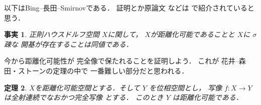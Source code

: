 \documentclass[leqno, a4paper, 12pt]{jsarticle}
\newtheorem{thm}{定理}
\newtheorem{fact}[thm]{事実}
\begin{document}
以下はBing--長田--Smirnovである．
証明とか原論文
などは
\cite{Den3}
で紹介されていると思う．
\begin{fact}\label{fact:bns}
正則ハウスドルフ空間
$X$に関して，
$X$が距離化可能であることと
$X$に
$\sigma$疎な
開基が存在することは同値である．
\end{fact}




今から距離化可能性が
完全像で保たれることを証明しよう．
これが
花井--森田・ストーンの定理の中で
一番難しい部分だと思われる．

\begin{thm}\label{thm:perper}
$X$を距離化可能空間とする．そして
$Y$
を位相空間とし，
写像
$f\colon X\to Y$
は全射連続でなおかつ完全写像
とする．
このとき
$Y$
は距離化可能である．

\end{thm}
\end{document}
